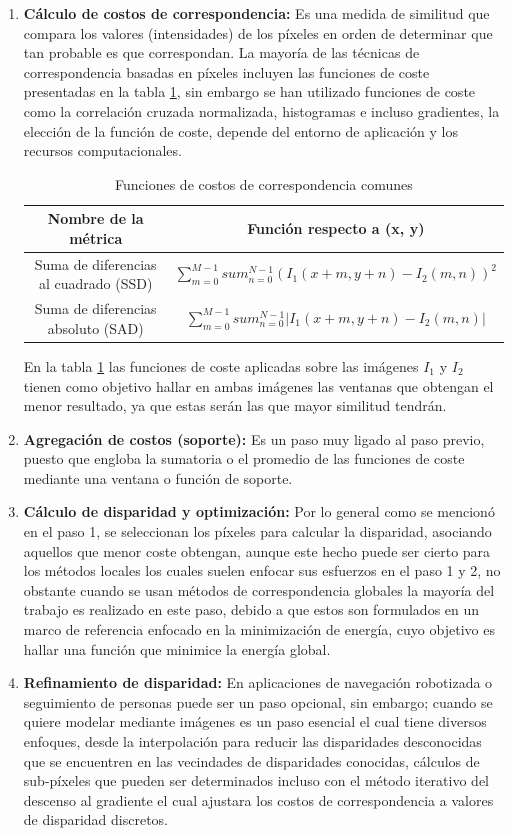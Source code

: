 \begin{enumerate}
    \item \textbf{Cálculo de costos de correspondencia:} Es una medida de similitud que compara los valores (intensidades) de los píxeles en orden de determinar que tan probable es que correspondan. La mayoría de las técnicas de correspondencia basadas en píxeles incluyen las funciones de coste presentadas en la tabla \ref{matchingCostTypes}, sin embargo se han utilizado funciones de coste como la correlación cruzada normalizada, histogramas e incluso gradientes, la elección de la función de coste, depende del entorno de aplicación y los recursos computacionales.
    \begin{table}[H]
    \centering
    \renewcommand{\arraystretch}{2}
    \caption{Funciones de costos de correspondencia comunes}
    \label{matchingCostTypes}
    \begin{tabular}{|c|c|}
    \hline
    Nombre de la métrica & Función respecto a (x, y) \\
    \hline
    Suma de diferencias al cuadrado (SSD) & $\sum_{m=0}^{M-1}sum_{n=0}^{N-1}(I_{1}(x+m, y+n) - I_{2}(m, n))^{2}$    \\
    \hline
    Suma de diferencias absoluto (SAD)    & $\sum_{m=0}^{M-1}sum_{n=0}^{N-1}\lvert I_{1}(x+m, y+n) - I_{2}(m, n)\rvert$ \\
    \hline
    \end{tabular}
    \end{table}
    En la tabla \ref{matchingCostTypes} las funciones de coste aplicadas sobre las imágenes $I_{1}$ y $I_{2}$ tienen como objetivo hallar en ambas imágenes las ventanas que obtengan el menor resultado, ya que estas serán las que mayor similitud tendrán.
    \item \textbf{Agregación de costos (soporte):} Es un paso muy ligado al paso previo, puesto que engloba la sumatoria o el promedio de las funciones de coste mediante una ventana o función de soporte. 
    \item \textbf{Cálculo de disparidad y optimización:} Por lo general como se mencionó en el paso 1, se seleccionan los píxeles para calcular la disparidad, asociando aquellos que menor coste obtengan, aunque este hecho puede ser cierto para los métodos locales los cuales suelen enfocar sus esfuerzos en el paso 1 y 2, no obstante cuando se usan métodos de correspondencia globales la mayoría del trabajo es realizado en este paso, debido a que estos son formulados en un marco de referencia enfocado en la minimización de energía, cuyo objetivo es hallar una función que minimice la energía global.
    \item \textbf{Refinamiento de disparidad:} En aplicaciones de navegación robotizada o seguimiento de personas puede ser un paso opcional, sin embargo; cuando se quiere modelar mediante imágenes es un paso esencial el cual tiene diversos enfoques, desde la interpolación para reducir las disparidades desconocidas que se encuentren en las vecindades de disparidades conocidas, cálculos de sub-píxeles que pueden ser determinados incluso con el método iterativo del descenso al gradiente el cual ajustara los costos de correspondencia a valores de disparidad discretos.
\end{enumerate}
